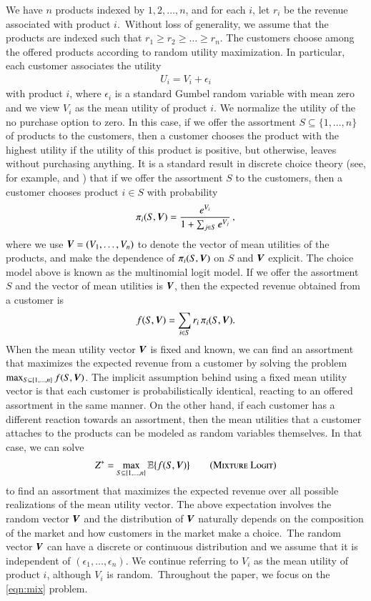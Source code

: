 We have $n$ products indexed by $1,2,\ldots,n$, and for each $i$, let $r_i$ be the revenue associated with product $i$.~Without loss of generality, we assume that the products are indexed such that  $r_1 \geq r_2 \geq \ldots \geq r_n$. The customers choose among the offered products according to random utility maximization. In particular, each customer associates the utility
%
%
\begin{align*}
U_i = V_i + \epsilon_i
\end{align*}
%
%
with product $i$, where $\epsilon_i$ is a standard Gumbel random variable with mean zero and we view $V_i$ as the mean utility of product $i$. We normalize the utility of the no purchase option to zero. In this case, if we offer the assortment $S \subseteq \{1,\ldots,n\}$ of products to the customers, then a customer chooses the product with the highest utility if the utility of this product is positive, but otherwise, leaves without purchasing anything. It is a standard result
in discrete choice theory (see, for example, \cite{BenAkivaL1985} and \cite{Tr03}) that if we offer the assortment $S$ to the customers, then a customer chooses product $i \in S$ with probability 
%
%
\begin{align*}
\pi_i(S,{\bm V}) = \frac{e^{V_i}}{1 + \sum_{j \in S} e^{V_j}} {\,} ,
\end{align*}
where we use ${\bm V} = (V_1,\ldots,V_n)$ to denote the vector of mean utilities of the products, and make the dependence of $\pi_i(S,{\bm V})$ on $S$ and ${\bm V}$ explicit. The choice model above is known as the multinomial logit model. If we offer the assortment $S$ and the vector of mean utilities is ${\bm V}$, then the expected revenue obtained from a customer is 
%
%
\begin{align*}
f(S,{\bm V}) = \sum_{i \in S} r_i {\,} \pi_i(S,{\bm V}).
\end{align*}
%
%
When the mean utility vector ${\bm V}$ is fixed and known, we can find an assortment that maximizes the expected revenue from a customer by solving the problem $\max_{S \subseteq \{1,\ldots,n\}} f(S,{\bm V})$. The implicit assumption behind using a fixed mean utility vector is that each customer is probabilistically identical, reacting to an offered assortment in the same manner. On the other hand, if each customer has a different reaction towards an assortment, then the mean utilities that a customer attaches to the products can be modeled as random variables themselves. In that case, we can solve
%
%
\begin{align*}
Z^* = \max_{S \subseteq \{1,\ldots,n\}} \mathbb E \{ f(S,{\bm V}) \}
\tag{\sc Mixture Logit}
\label{eqn:mix}
\end{align*}
%
%
to find an assortment that maximizes the expected revenue over all possible realizations of the mean utility vector. The above expectation  involves the random vector ${\bm V}$ and the distribution of ${\bm V}$ naturally depends on the composition of the market and how customers in the market make a choice.~The random vector ${\bm V}$ can have a discrete or continuous distribution and we assume that it is independent of $(\epsilon_1,\ldots, \epsilon_n)$. We continue referring to $V_i$ as the mean utility of product $i$, although $V_i$ is random.~Throughout the paper, we focus on the \ref{eqn:mix} problem.


